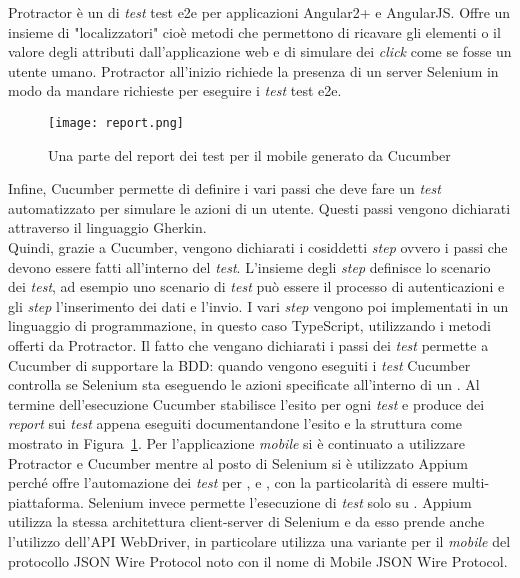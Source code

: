 Protractor è un  di \emph{test} \gls{test e2e} per applicazioni Angular2+ e AngularJS. Offre un insieme di "localizzatori" cioè metodi che permettono di ricavare gli elementi o il valore degli attributi dall'applicazione web e di simulare dei \emph{click} come se fosse un utente umano. Protractor all'inizio richiede la presenza di un server Selenium in modo da mandare richieste  per eseguire i \emph{test} \gls{test e2e}.\\

\begin{figure}[h] 
	\begin{center}
		\texttt{[image: report.png]}
		\caption{Una parte del report dei test per il mobile generato da Cucumber}\label{fig:testDoc}
	\end{center}
\end{figure}

Infine, Cucumber permette di definire i vari passi che deve fare un \emph{test} automatizzato per simulare le azioni di un utente. Questi passi vengono dichiarati attraverso il linguaggio Gherkin.\\
Quindi, grazie a Cucumber, vengono dichiarati i cosiddetti \emph{step} ovvero i passi che devono essere fatti all'interno del \emph{test}. L'insieme degli \emph{step} definisce lo scenario dei \emph{test}, ad esempio uno scenario di \emph{test} può essere il processo di autenticazioni e gli \emph{step} l'inserimento dei dati e l'invio. I vari \emph{step} vengono poi implementati in un linguaggio di programmazione, in questo caso TypeScript, utilizzando i metodi offerti da Protractor. Il fatto che vengano dichiarati i passi dei \emph{test} permette a Cucumber di supportare la \gls{BDD}: quando vengono eseguiti i \emph{test} Cucumber controlla se Selenium sta eseguendo le azioni specificate all’interno di un . Al termine dell'esecuzione Cucumber stabilisce l'esito per ogni \emph{test} e produce dei \emph{report} sui \emph{test} appena eseguiti documentandone l'esito e la struttura come mostrato in Figura~\ref{fig:testDoc}.
\clearpage
Per l'applicazione \emph{mobile} si è continuato a utilizzare Protractor e Cucumber mentre al posto di Selenium si è utilizzato Appium perché offre l'automazione dei \emph{test} per \textcolor{SchoolColor}{\ap{[g]}}, \textcolor{SchoolColor}{\ap{[g]}} e \textcolor{SchoolColor}{\ap{[g]}}, con la particolarità di essere multi-piattaforma. Selenium invece permette l'esecuzione di \emph{test} solo su . Appium utilizza la stessa architettura client-server di Selenium e da esso prende anche l'utilizzo dell'API WebDriver, in particolare utilizza una variante per il \emph{mobile} del protocollo JSON Wire Protocol noto con il nome di Mobile JSON Wire Protocol. 

